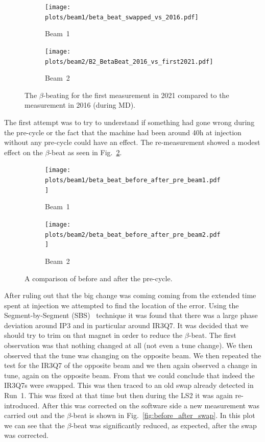 \documentclass{cernatsnote}
\begin{document}
\begin{figure}[ht]
\begin{subfigure}{.5\textwidth}
  \centering
  \texttt{[image: plots/beam1/beta\_beat\_swapped\_vs\_2016.pdf]}  
  \caption{Beam~1}
\end{subfigure}
\begin{subfigure}{.5\textwidth}
  \centering
  \texttt{[image: plots/beam2/B2\_BetaBeat\_2016\_vs\_first2021.pdf]}  
  \caption{Beam~2}
\end{subfigure}
\caption{The $\beta$-beating for the first measurement in 2021 compared to the measurement in 2016 (during MD).}
\label{fig:initalVs2016}
\end{figure}

The first attempt was to try to understand if something had gone wrong during the pre-cycle or the fact that the machine had been around 40h at injection without any pre-cycle could have an effect. The re-measurement showed a modest effect on the $\beta$-beat as seen in Fig.~\ref{fig:before_after_pre_cycle}.

\begin{figure}[ht]
\begin{subfigure}{.5\textwidth}
  \centering
  \texttt{[image: plots/beam1/beta\_beat\_before\_after\_pre\_beam1.pdf]}  
  \caption{Beam~1}
\end{subfigure}
\begin{subfigure}{.5\textwidth}
  \centering
  \texttt{[image: plots/beam2/beta\_beat\_before\_after\_pre\_beam2.pdf]}  
  \caption{Beam~2}
\end{subfigure}
\caption{A comparison of before and after the pre-cycle.}
\label{fig:before_after_pre_cycle}
\end{figure}


After ruling out that the big change was coming coming from the extended time spent at injection we attempted to find the location of the error. Using the Segment-by-Segment (SBS)~\cite{} technique it was found that there was a large phase deviation around IP3 and in particular around IR3Q7. It was decided that we should try to trim on that magnet in order to reduce the $\beta$-beat. The first observation was that nothing changed at all (not even a tune change). We then observed that the tune was changing on the opposite beam. We then repeated the test for the IR3Q7 of the opposite beam and we then again observed a change in tune, again on the opposite beam. From that we could conclude that indeed the IR3Q7s were swapped. This was then traced to an old swap already detected in Run~1. This was fixed at that time but then during the LS2 it was again re-introduced. After this was corrected on the software side a new measurement was carried out and the $\beta$-beat is shown in Fig.~\ref{fig:before_after_swap}. In this plot we can see that the $\beta$-beat was significantly reduced, as expected, after the swap was corrected.  
\end{document}
